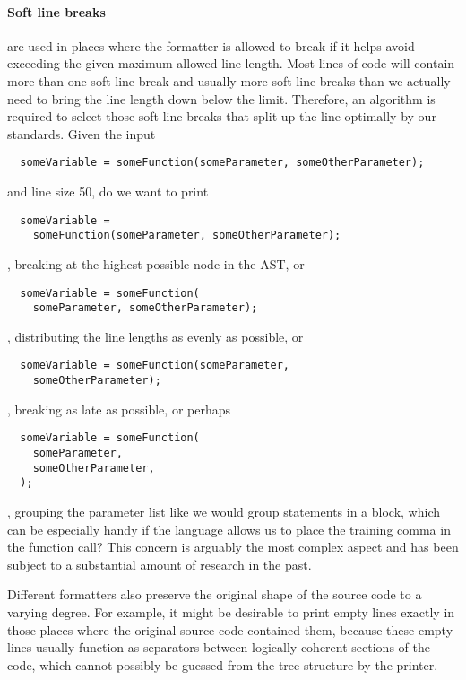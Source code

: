 \paragraph{Soft line breaks} are used in places where the formatter is allowed to break
if it helps avoid exceeding the given maximum allowed line length.
Most lines of code will contain more than one soft line break and usually more soft line breaks
than we actually need to bring the line length down below the limit.
Therefore, an algorithm is required to select those soft line breaks
that split up the line optimally by our standards.
Given the input
\begin{verbatim}
  someVariable = someFunction(someParameter, someOtherParameter);
\end{verbatim}
and line size 50, do we want to print
\begin{verbatim}
  someVariable =
    someFunction(someParameter, someOtherParameter);
\end{verbatim}
, breaking at the highest possible node in the AST, or
\begin{verbatim}
  someVariable = someFunction(
    someParameter, someOtherParameter);
\end{verbatim}
, distributing the line lengths as evenly as possible, or
\begin{verbatim}
  someVariable = someFunction(someParameter,
    someOtherParameter);
\end{verbatim}
, breaking as late as possible, or perhaps
\begin{verbatim}
  someVariable = someFunction(
    someParameter,
    someOtherParameter,
  );
\end{verbatim}
, grouping the parameter list like we would group statements in a block,
which can be especially handy if the language allows us to place the training comma in the function call?
This concern is arguably the most complex aspect and has been subject to a substantial amount of research in the past.
\autocite{designPrettyPrintingLib}\autocite{prettierPrinter}

\bigbreak{}
Different formatters also preserve the original shape of the source code to a varying degree.
For example, it might be desirable to print empty lines
exactly in those places where the original source code contained them,
\autocite[Section: Empty lines]{prettierRationale}
because these empty lines usually function as separators between logically coherent sections of the code,
which cannot possibly be guessed from the tree structure by the printer.
